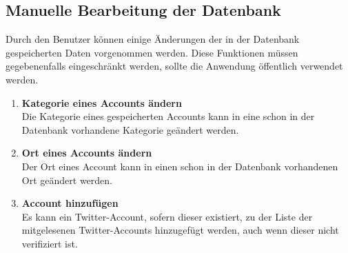 \subsection{Manuelle Bearbeitung der Datenbank}
Durch den Benutzer können einige Änderungen der in der Datenbank  gespeicherten Daten vorgenommen werden. Diese Funktionen müssen gegebenenfalls eingeschränkt werden, sollte die Anwendung öffentlich verwendet werden.
\begin{enumerate}[ align=left, label={\textbf{\textbackslash F40\arabic*0\textbackslash}}]
	\item \textbf{Kategorie eines Accounts ändern}  \label{PF:KategorieAendern} \\
	Die Kategorie eines gespeicherten Accounts kann in eine schon in der Datenbank vorhandene Kategorie geändert werden.
	\item \textbf{Ort eines Accounts ändern} \\
	Der Ort eines Account kann in einen schon in der Datenbank vorhandenen Ort geändert werden.
	\item \textbf{Account hinzufügen} \label{PF:AccountHinzu} \\
	Es kann ein Twitter-Account, sofern dieser existiert, zu der Liste der mitgelesenen Twitter-Accounts hinzugefügt werden, auch wenn dieser nicht verifiziert ist.
\end{enumerate}

